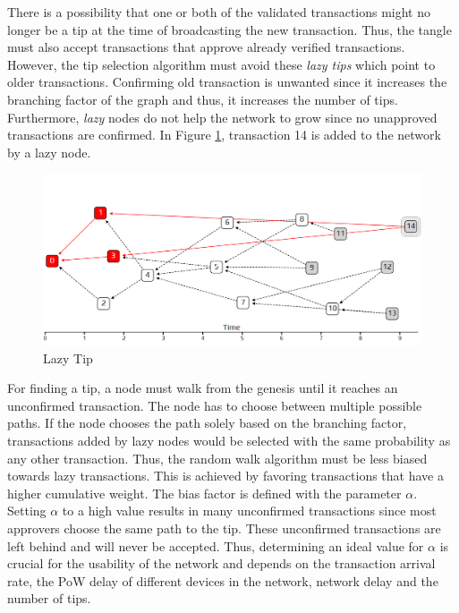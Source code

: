 There is a possibility that one or both of the validated transactions might no longer be a tip at the time of broadcasting the new transaction. Thus, the tangle must also accept transactions that approve already verified transactions. However, the tip selection algorithm must avoid these \textit{lazy tips} which point to older transactions. Confirming old transaction is unwanted since it increases the branching factor of the graph and thus, it increases the number of tips. Furthermore, \textit{lazy} nodes do not help the network to grow since no unapproved transactions are confirmed. In Figure \ref{fig:lazy-tip}, transaction 14 is added to the network by a lazy node. 


\begin{figure}[H]
    \centering
    \includegraphics[width=1.0\textwidth]{images/lazy-tip.png}
    \caption{Lazy Tip \cite{the-tangle-part-3}}
    \label{fig:lazy-tip}
\end{figure}

For finding a tip, a node must walk from the genesis until it reaches an unconfirmed transaction. The node has to choose between multiple possible paths. If the node chooses the path solely based on the branching factor, transactions added by lazy nodes would be selected with the same probability as any other transaction. Thus, the random walk algorithm must be less biased towards lazy transactions. 
This is achieved by favoring transactions that have a higher cumulative weight. The bias factor is defined with the parameter $\alpha$. Setting $\alpha$ to a high value results in many unconfirmed transactions since most approvers choose the same path to the tip. These unconfirmed transactions are left behind and will never be accepted. Thus, determining an ideal value for $\alpha$ is crucial for the usability of the network and depends on the transaction arrival rate, the PoW delay of different devices in the network, network delay and the number of tips. 

